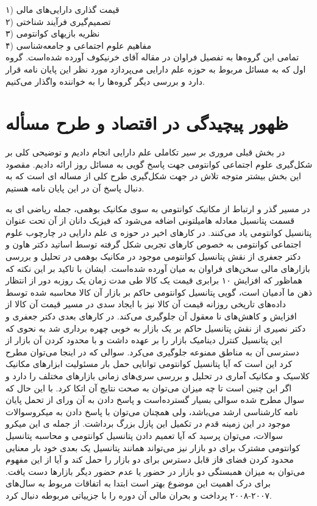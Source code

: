 \documentclass[a4paper,titlepage,12pt,fleqn,oneside]{report}
\begin{document}
۱) قیمت گذاری دارایی‌های مالی\\
۲) تصمیم‌گیری فرآیند شناختی\\
۳) نظریه بازیهای کوانتومی\\
۴) مفاهیم علوم اجتماعی و جامعه‌شناسی\\
تمامی این گروه‌ها به تفصیل فراوان در مقاله آقای خرنیکوف\cite{kh1} آورده شده‌است. گروه اول که به مسائل مربوط به حوزه علم دارایی می‌پردازد مورد نظر این پایان نامه قرار دارد و بررسی دیگر گروه‌ها را به خواننده واگذار می‌کنیم.


    \section{ظهور پیچیدگی در اقتصاد و طرح مسأله}
در بخش قبلی مروری بر سیر تکاملی علم دارایی انجام دادیم و توضیحی کلی بر شکل‌گیری علوم اجتماعی کوانتومی جهت پاسخ گویی به مسائل روز ارائه دادیم. مقصود این بخش بیشتر متوجه تلاش در جهت شکل‌گیری طرح کلی از مساله ای است که به دنبال پاسخ آن در این پایان نامه هستیم. 

در مسیر گذر و ارتباط از مکانیک کوانتومی به سوی مکانیک بوهمی، جمله ریاضی ای به قسمت پتانسیل معادله هامیلتونی اضافه می‌شود که فیزیک دانان از آن تحت عنوان پتانسیل کوانتومی یاد می‌کنند. 
در کارهای اخیر در حوزه ی علم دارایی در چارچوب علوم اجتماعی کوانتومی به خصوص کارهای تجربی شکل گرفته توسط اساتید دکتر هاون\cite{haven1} و 
دکتر جعفری\cite{tahmaseb} از نقش پتانسیل کوانتومی موجود در مکانیک بوهمی در تحلیل و بررسی بازارهای مالی سخن‌های فراوان به میان آورده شده‌است. ایشان با تاکید بر این نکته که هماظور که افزایش ۱۰ برابری قیمت یک کالا طی مدت زمان یک روزبه دور از انتظار ذهن ما آدمیان است، گویی پتانسیل کوانتومی حاکم بر بازار آن کالا محاسبه شده توسط داده‌های تاریخی روزانه قیمت آن کالا نیز با ایجاد سدی در مسیر قیمت آن کالا از افزایش و کاهش‌های نا معقول آن جلوگیری می‌کند. در کارهای بعدی دکتر جعفری و دکتر نصیری از نقش پتانسیل حاکم بر یک بازار به خوبی چهره برداری شد به نحوی که این پتانسیل کنترل دینامیک بازار را بر عهده داشت و با محدود کردن آن بازار از دسترسی آن به مناطق ممنوعه جلوگیری می‌کرد\cite{nas1}\cite{nas2}. سوالی که در اینجا می‌توان مطرح کرد این است که آیا پتانسیل کوانتومی توانایی حمل بار مسئولیت ابزارهای مکانیک کلاسیک و مکانیک آماری در تحلیل و بررسی سری‌های زمانی بازارهای مختلف را دارد و اگر این چنین است تا چه میزان می‌توان به صحت نتایج آن اتکا کرد. با این حال که سوال مطرح شده سوالی بسیار گسترده‌است و پاسخ دادن به آن ورای از تحمل پایان نامه کارشناسی ارشد می‌باشد، ولی همچنان می‌توان با پاسخ دادن به میکروسوالات موجود در این زمینه قدم در تکمیل این پازل بزرگ برداشت. از جمله ی این میکرو سوالات، می‌توان پرسید که آیا تعمیم دادن پتانسیل کوانتومی و محاسبه پتانسیل کوانتومی مشترک برای دو بازار نیز می‌تواند همانند پتانسیل یک بعدی خود بار معنایی محدود کردن فضای فاز قابل دسترس برای دو بازار را حمل کند و آیا از این مفهوم می‌توان به میزان همبستگی دو بازار در حضور یا عدم حضور دیگر بازار‌ها دست یافت. برای درک اهمیت این موضوع بهتر است ابتدا به اتفاقات مربوط به سال‌های ۲۰۰۷-۲۰۰۸ پرداخت و بحران مالی آن دوره را با جزییاتی مربوطه دنبال کرد.\newline
\end{document}
